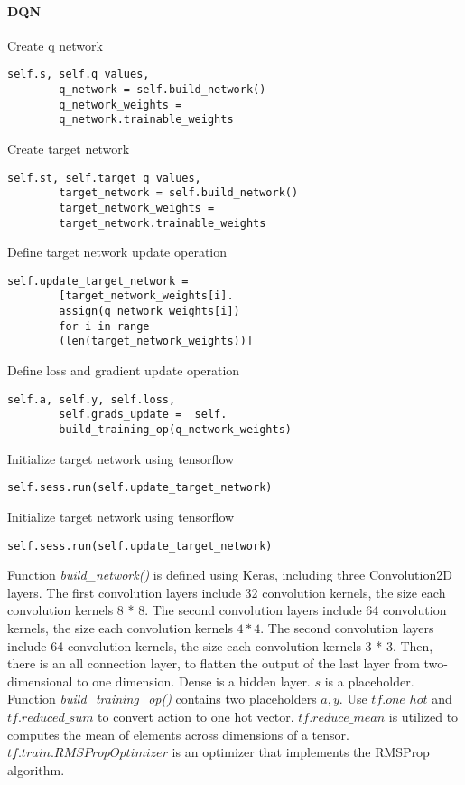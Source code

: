 \documentclass[10pt,twocolumn,letterpaper]{article}
\begin{document}
	\paragraph{DQN}$\ $\\
	Create q network
	\begin{lstlisting}[frame=shadowbox]
		self.s, self.q_values, 
		q_network = self.build_network()
		q_network_weights =
		q_network.trainable_weights
	\end{lstlisting}
	Create target network
	\begin{lstlisting}[frame=shadowbox]
		self.st, self.target_q_values,
		target_network = self.build_network()
		target_network_weights =
		target_network.trainable_weights
	\end{lstlisting}
	Define target network update operation
	\begin{lstlisting}[frame=shadowbox]
		self.update_target_network =
		[target_network_weights[i].
		assign(q_network_weights[i]) 
		for i in range
		(len(target_network_weights))]
	\end{lstlisting}
	Define loss and gradient update operation
	\begin{lstlisting}[frame=shadowbox]
		self.a, self.y, self.loss,
		self.grads_update =  self.
		build_training_op(q_network_weights)
	\end{lstlisting}
	Initialize target network using tensorflow
	\begin{lstlisting}[frame=shadowbox]
		self.sess.run(self.update_target_network)
	\end{lstlisting}
	Initialize target network using tensorflow
	\begin{lstlisting}[frame=shadowbox]
		self.sess.run(self.update_target_network)
	\end{lstlisting}
	Function \emph{build\_network()} is defined using Keras, including three Convolution2D layers.
	The first convolution layers include 32 convolution kernels, the size each convolution kernels 8 * 8. The second convolution layers include 64 convolution kernels, the size each convolution kernels $4 * 4$. The second convolution layers include 64 convolution kernels, the size each convolution kernels 3 * 3. Then, there is an all connection layer, to flatten the output of the last layer from two-dimensional to one dimension. Dense is a hidden layer. $s$ is a placeholder.\\
	Function \emph{build\_training\_op()} contains two placeholders $a,y$. Use $tf.one\_hot$ and $tf.reduced\_sum$ to convert action to one hot vector. $tf.reduce\_mean$ is utilized to computes the mean of elements across dimensions of a tensor. $tf.train.RMSPropOptimizer$ is an optimizer that implements the RMSProp algorithm.\\
\end{document}
